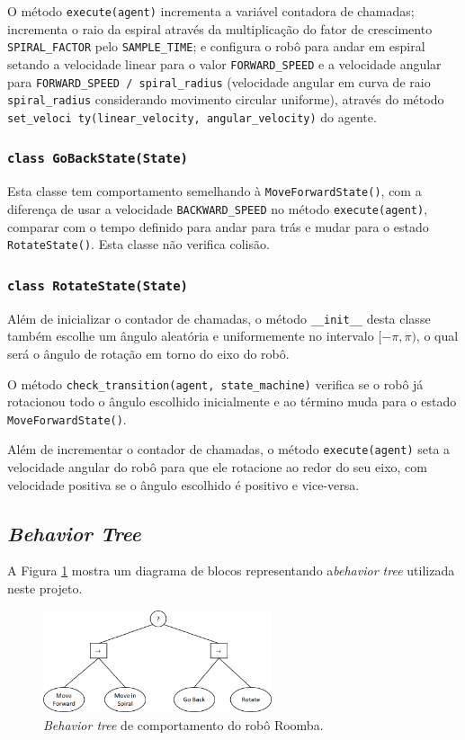 \documentclass[brazil, 12pt]{article}
\begin{document}
O método \texttt{execute(agent)} incrementa a variável contadora de chamadas; incrementa o raio da espiral através da multiplicação do fator de crescimento \texttt{SPIRAL\_FACTOR} pelo \texttt{SAMPLE\_TIME}; e configura o robô para andar em espiral setando a velocidade linear para o valor \texttt{FORWARD\_SPEED} e a velocidade angular para \texttt{FORWARD\_SPEED / spiral\_radius} (velocidade angular em curva de raio \texttt{spiral\_radius} considerando movimento circular uniforme), através do método \texttt{set\_veloci ty(linear\_velocity, angular\_velocity)} do agente.

\subsubsection{\texttt{class GoBackState(State)}}
Esta classe tem comportamento semelhando à \texttt{MoveForwardState()}, com a diferença de usar a velocidade \texttt{BACKWARD\_SPEED} no método \texttt{execute(agent)}, comparar com o tempo definido para andar para trás e mudar para o estado \texttt{RotateState()}. Esta classe não verifica colisão.

\subsubsection{\texttt{class RotateState(State)}}
Além de inicializar o contador de chamadas, o método \texttt{\_\_init\_\_} desta classe também escolhe um ângulo aleatória e uniformemente no intervalo $[-\pi,\pi)$, o qual será o ângulo de rotação em torno do eixo do robô.

O método \texttt{check\_transition(agent, state\_machine)} verifica se o robô já rotacionou todo o ângulo escolhido inicialmente e ao término muda para o estado \texttt{MoveForwardState()}.

Além de incrementar o contador de chamadas, o método \texttt{execute(agent)} seta a velocidade angular do robô para que ele rotacione ao redor do seu eixo, com velocidade positiva se o ângulo escolhido é positivo e vice-versa.

\subsection{\textit{Behavior Tree}}
A Figura \ref{fig:BT} mostra um diagrama de blocos representando a\textit{behavior tree} utilizada neste projeto.

\begin{figure}[H]
	\centering
	\includegraphics[width=0.6\textwidth]{BT} %
	\caption{\textit{Behavior tree} de comportamento do robô Roomba.} %
	\label{fig:BT}  %
\end{figure} 
\end{document}
